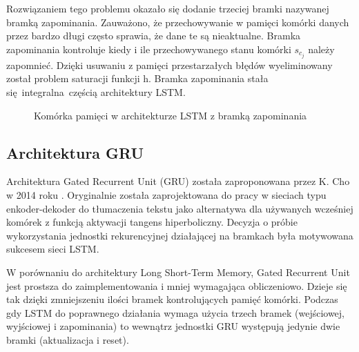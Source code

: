 \documentclass[10pt,a4paper]{article}
\begin{document}
Rozwiązaniem tego problemu okazało się dodanie trzeciej bramki nazywanej bramką zapominania. Zauważono, że przechowywanie w pamięci komórki danych przez bardzo długi często sprawia, że dane te są nieaktualne. Bramka zapominania kontroluje kiedy i ile przechowywanego stanu komórki $s_{c_j}$ należy zapomnieć. Dzięki usuwaniu z pamięci przestarzałych błędów wyeliminowany został problem saturacji funkcji h. Bramka zapominania stała się integralna częścią architektury LSTM. 

\begin{figure}[!ht]
	\centering
	\caption{Komórka pamięci w architekturze LSTM z bramką zapominania}
\end{figure}
\FloatBarrier
\newpage
\subsection{Architektura GRU}
\label{subsection:introduction:GRU}
Architektura Gated Recurrent Unit (GRU) została zaproponowana przez K. Cho w 2014 roku \cite{https://doi.org/10.48550/arxiv.1406.1078}. Oryginalnie została zaprojektowana do pracy w sieciach typu enkoder-dekoder do tłumaczenia tekstu jako alternatywa dla używanych wcześniej komórek z funkcją aktywacji tangens hiperboliczny. Decyzja o próbie wykorzystania jednostki rekurencyjnej działającej na bramkach była motywowana sukcesem sieci LSTM.

W porównaniu do architektury Long Short-Term Memory, Gated Recurrent Unit jest prostsza do zaimplementowania i mniej wymagająca obliczeniowo. Dzieje się tak dzięki zmniejszeniu ilości bramek kontrolujących pamięć komórki. Podczas gdy LSTM do poprawnego działania wymaga użycia trzech bramek (wejściowej, wyjściowej i zapominania) to wewnątrz jednostki GRU występują jedynie dwie bramki (aktualizacja i reset). 
\end{document}
